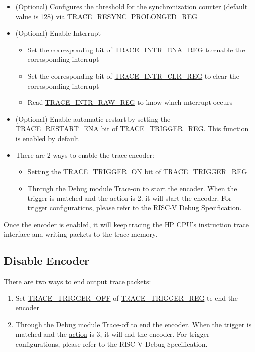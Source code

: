 \documentclass[main\_\_EN.tex]{subfiles}
\begin{document}
\begin{itemize}
    \item (Optional) Configures the threshold for the synchronization counter (default value is 128) via \hyperref[regdesc:TRACERESYNCPROLONGEDREG]{TRACE\_RESYNC\_PROLONGED\_REG}


    \item (Optional) Enable Interrupt
        \begin{itemize}
            \item Set the corresponding bit of \hyperref[regdesc:TRACEINTRENAREG]{TRACE\_INTR\_ENA\_REG} to enable the corresponding interrupt
            \item Set the corresponding bit of \hyperref[regdesc:TRACEINTRCLRREG]{TRACE\_INTR\_CLR\_REG} to clear the corresponding interrupt
            \item Read \hyperref[regdesc:TRACEINTRRAWREG]{TRACE\_INTR\_RAW\_REG} to know which interrupt occurs
        \end{itemize}
    \item (Optional) Enable automatic restart by setting the \hyperref[fielddesc:TRACERESTARTENA]{TRACE\_RESTART\_ENA} bit of \hyperref[regdesc:TRACETRIGGERREG]{TRACE\_TRIGGER\_REG}. This function is enabled by default



    \item There are 2 ways to enable the trace encoder:
        \begin{itemize}
            \item Setting the \hyperref[fielddesc:TRACETRIGGERON]{TRACE\_TRIGGER\_ON} bit of \hyperref[regdesc:TRACETRIGGERREG]{TRACE\_TRIGGER\_REG}
            \item Through the Debug module Trace-on to start the encoder. When the trigger is matched and the \hyperref[fielddesc:MCONTROLACTION]{action} is 2, it will start the encoder. For trigger configurations, please refer to the RISC-V Debug Specification.
        \end{itemize}

\end{itemize}

Once the encoder is enabled, it will keep tracing the HP CPU's instruction trace interface and writing packets to the trace memory.

\subsection{Disable Encoder}

There are two ways to end output trace packets:
\begin{enumerate}
    \item Set \hyperref[fielddesc:TRACETRIGGEROFF]{TRACE\_TRIGGER\_OFF} of \hyperref[regdesc:TRACETRIGGERREG]{TRACE\_TRIGGER\_REG} to end the encoder
    \item Through the Debug module Trace-off to end the encoder. When the trigger is matched and the \hyperref[fielddesc:MCONTROLACTION]{action} is 3, it will end the encoder. For trigger configurations, please refer to the RISC-V Debug Specification.
\end{enumerate}
\end{document}
